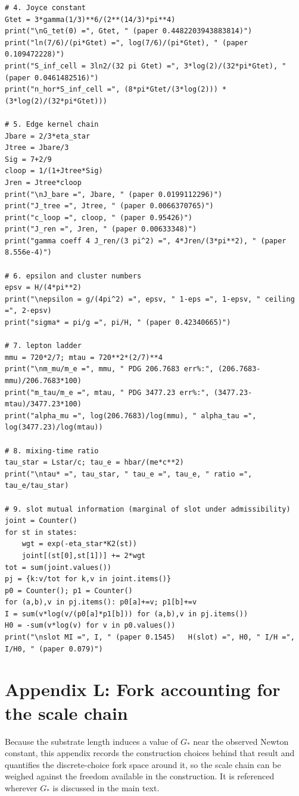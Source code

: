 \documentclass[11pt]{article}
\begin{document}
{\begin{verbatim}
# 4. Joyce constant
Gtet = 3*gamma(1/3)**6/(2**(14/3)*pi**4)
print("\nG_tet(0) =", Gtet, " (paper 0.4482203943883814)")
print("ln(7/6)/(pi*Gtet) =", log(7/6)/(pi*Gtet), " (paper 0.109472228)")
print("S_inf_cell = 3ln2/(32 pi Gtet) =", 3*log(2)/(32*pi*Gtet), " (paper 0.0461482516)")
print("n_hor*S_inf_cell =", (8*pi*Gtet/(3*log(2))) * (3*log(2)/(32*pi*Gtet)))

# 5. Edge kernel chain
Jbare = 2/3*eta_star
Jtree = Jbare/3
Sig = 7+2/9
cloop = 1/(1+Jtree*Sig)
Jren = Jtree*cloop
print("\nJ_bare =", Jbare, " (paper 0.0199112296)")
print("J_tree =", Jtree, " (paper 0.0066370765)")
print("c_loop =", cloop, " (paper 0.95426)")
print("J_ren =", Jren, " (paper 0.00633348)")
print("gamma coeff 4 J_ren/(3 pi^2) =", 4*Jren/(3*pi**2), " (paper 8.556e-4)")

# 6. epsilon and cluster numbers
epsv = H/(4*pi**2)
print("\nepsilon = g/(4pi^2) =", epsv, " 1-eps =", 1-epsv, " ceiling =", 2-epsv)
print("sigma* = pi/g =", pi/H, " (paper 0.42340665)")

# 7. lepton ladder
mmu = 720*2/7; mtau = 720**2*(2/7)**4
print("\nm_mu/m_e =", mmu, " PDG 206.7683 err%:", (206.7683-mmu)/206.7683*100)
print("m_tau/m_e =", mtau, " PDG 3477.23 err%:", (3477.23-mtau)/3477.23*100)
print("alpha_mu =", log(206.7683)/log(mmu), " alpha_tau =", log(3477.23)/log(mtau))

# 8. mixing-time ratio
tau_star = Lstar/c; tau_e = hbar/(me*c**2)
print("\ntau* =", tau_star, " tau_e =", tau_e, " ratio =", tau_e/tau_star)

# 9. slot mutual information (marginal of slot under admissibility)
joint = Counter()
for st in states:
    wgt = exp(-eta_star*K2(st))
    joint[(st[0],st[1])] += 2*wgt
tot = sum(joint.values())
pj = {k:v/tot for k,v in joint.items()}
p0 = Counter(); p1 = Counter()
for (a,b),v in pj.items(): p0[a]+=v; p1[b]+=v
I = sum(v*log(v/(p0[a]*p1[b])) for (a,b),v in pj.items())
H0 = -sum(v*log(v) for v in p0.values())
print("\nslot MI =", I, " (paper 0.1545)   H(slot) =", H0, " I/H =", I/H0, " (paper 0.079)")
\end{verbatim}}

\section*{Appendix L: Fork accounting for the scale chain}

Because the substrate length induces a value of $G_*$ near the observed Newton constant, this appendix records the construction choices behind that result and quantifies the discrete-choice fork space around it, so the scale chain can be weighed against the freedom available in the construction. It is referenced wherever $G_*$ is discussed in the main text.
\end{document}
